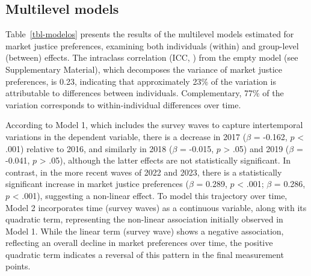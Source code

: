 \documentclass[
  12pt,
]{article}
\begin{document}
\subsection{Multilevel models}\label{multilevel-models}

Table~\ref{tbl-modelos} presents the results of the multilevel models
estimated for market justice preferences, examining both individuals
(within) and group-level (between) effects. The intraclass correlation
(ICC,
)
from the empty model (see Supplementary Material), which decomposes the
variance of market justice preferences, is 0.23, indicating that
approximately 23\% of the variation is attributable to differences
between individuals. Complementary, 77\% of the variation corresponds to
within-individual differences over time.

According to Model 1, which includes the survey waves to capture
intertemporal variations in the dependent variable, there is a decrease
in 2017 (\(\beta\) = -0.162, \(p\) \textless{} .001) relative to 2016,
and similarly in 2018 (\(\beta\) = -0.015, \(p\) \textgreater{} .05) and
2019 (\(\beta\) = -0.041, \(p\) \textgreater{} .05), although the latter
effects are not statistically significant. In contrast, in the more
recent waves of 2022 and 2023, there is a statistically significant
increase in market justice preferences (\(\beta\) = 0.289, \(p\)
\textless{} .001; \(\beta\) = 0.286, \(p\) \textless{} .001), suggesting
a non-linear effect. To model this trajectory over time, Model 2
incorporates time (survey waves) as a continuous variable, along with
its quadratic term, representing the non-linear association initially
observed in Model 1. While the linear term (survey wave) shows a
negative association, reflecting an overall decline in market
preferences over time, the positive quadratic term indicates a reversal
of this pattern in the final measurement points.
\end{document}
